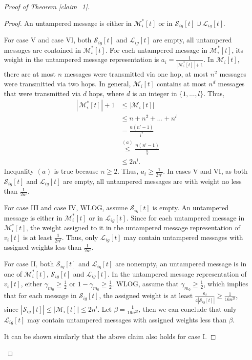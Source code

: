 \documentclass[letterpaper, 11pt]{article}
\newcommand{\calL}{{\mathcal{L}}}
\newcommand{\calM}{{\mathcal{M}}}
\newcommand{\calS}{{\mathcal{S}}}
\begin{document}
\begin{proof}[Proof of Theorem \ref{claim_1}]
\begin{proof}
An untampered message is either in $\calM^*_i[t]$ or in $\calS_{ig}[t]\cup\calL_{ig}[t]$.

For case V and case VI, both $\calS_{ig}[t]$ and $\calL_{ig}[t]$ are empty, all untampered messages are contained in $\calM^*_i[t]$.
For each untampered message in $\calM_i^*[t]$, its weight in the untampered message representation is $a_i=\frac{1}{|\calM^*_i[t]|+1}$. In $\calM_i[t]$, there are at most $n$ messages were transmitted via one hop, at most $n^2$ messages were transmitted via two hops. In general, $\calM_i[t]$ contains at most $n^d$ messages that were transmitted via $d$ hops, where $d$ is an integer in $\{1,\ldots, l\}$. Thus,
\begin{align*}
|\calM^*_i[t]|+1&\le |\calM_i[t]|\\
&\le n+n^2+\ldots+n^l\\
&=\frac{n(n^l-1)}{l^*}\\
&\overset{(a)}{\le} \frac{n(n^l-1)}{\frac{n}{2}}\\
&\le 2n^{l}.
\end{align*}
Inequality $(a)$ is true because $n\ge 2$. Thus, $a_i\ge \frac{1}{2n^l}$. In cases V and VI, as both $\calS_{ig}[t]$ and $\calL_{ig}[t]$ are empty, all untampered messages are with weight no less than $\frac{1}{2n^l}$.

For case III and case IV, WLOG, assume $\calS_{ig}[t]$ is empty.
An untampered message is either in $\calM_i^*[t]$ or in $\calL_{ig}[t]$. Since for each untampered message in $\calM_i^*[t]$, the weight assigned to it in the untampered message representation of $v_i[t]$ is at least $\frac{1}{2n^l}$. Thus, only $\calL_{ig}[t]$ may contain untampered messages with assigned weights less than $\frac{1}{2n^l}$.

For case II, both $\calS_{ig}[t]$ and $\calL_{ig}[t]$ are nonempty, an untampered message is in one of $\calM_i^*[t]$, $\calS_{ig}[t]$ and $\calL_{ig}[t]$. In the untampered message representation of $v_i[t]$,  either $\gamma_{m_0}\ge \frac{1}{2}$ or $1-\gamma_{m_0}\ge \frac{1}{2}$.  WLOG, assume that $\gamma_{m_0}\ge \frac{1}{2}$, which  implies that for each message in $\calS_{ig}[t]$, the assigned weight is at least $\frac{a_i}{4|\calS_{ig}[t]|}\ge \frac{1}{16n^{2l}}$, since $|\calS_{ig}[t]|\le |\calM_i[t]|\le 2n^l$. Let $\beta=\frac{1}{16n^{2l}}$, then we can conclude that only $\calL_{ig}[t]$ may contain untampered messages with assigned weights less than $\beta$.

It can be shown similarly that the above claim also holds for case I.


\end{proof}
\end{proof}
\end{document}
